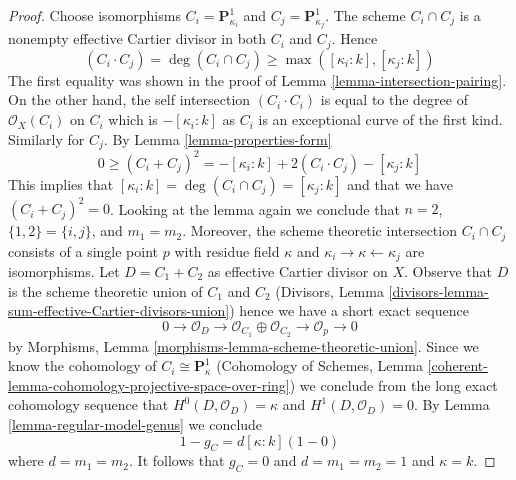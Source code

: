\documentclass[10pt,a4paper]{amsart}
\theoremstyle{plain}
\theoremstyle{definition}
\theoremstyle{remark}
\numberwithin{equation}{subsection}
\begin{document}
\begin{proof}
Choose isomorphisms $C_i = \mathbf{P}^1_{\kappa_i}$ and
$C_j = \mathbf{P}^1_{\kappa_j}$. The scheme $C_i \cap C_j$
is a nonempty effective Cartier divisor in both $C_i$ and $C_j$.
Hence
$$
(C_i \cdot C_j) = \deg(C_i \cap C_j) \geq \max([\kappa_i: k], [\kappa_j : k])
$$
The first equality was shown in the proof of
Lemma \ref{lemma-intersection-pairing}.
On the other hand, the self intersection $(C_i \cdot C_i)$ is equal
to the degree of $\mathcal{O}_X(C_i)$ on $C_i$ which is $-[\kappa_i : k]$
as $C_i$ is an exceptional curve of the first kind. Similarly for
$C_j$. By Lemma \ref{lemma-properties-form}
$$
0 \geq (C_i + C_j)^2 = -[\kappa_i : k] + 2(C_i \cdot C_j) - [\kappa_j : k]
$$
This implies that $[\kappa_i : k] = \deg(C_i \cap C_j) = [\kappa_j : k]$
and that we have $(C_i + C_j)^2 = 0$. Looking at the lemma again
we conclude that $n = 2$, $\{1, 2\} = \{i, j\}$, and $m_1 = m_2$.
Moreover, the scheme theoretic intersection $C_i \cap C_j$ consists of
a single point $p$ with residue field $\kappa$ and
$\kappa_i \to \kappa \leftarrow \kappa_j$ are isomorphisms.
Let $D = C_1 + C_2$ as effective Cartier divisor on $X$.
Observe that $D$ is the scheme theoretic union of $C_1$ and $C_2$
(Divisors, Lemma \ref{divisors-lemma-sum-effective-Cartier-divisors-union})
hence we have a short exact sequence
$$
0 \to \mathcal{O}_D \to \mathcal{O}_{C_1} \oplus \mathcal{O}_{C_2} \to
\mathcal{O}_p \to 0
$$
by Morphisms, Lemma \ref{morphisms-lemma-scheme-theoretic-union}.
Since we know the cohomology of $C_i \cong \mathbf{P}^1_\kappa$
(Cohomology of Schemes, Lemma
\ref{coherent-lemma-cohomology-projective-space-over-ring})
we conclude from the long exact cohomology sequence that
$H^0(D, \mathcal{O}_D) = \kappa$ and
$H^1(D, \mathcal{O}_D) = 0$. By Lemma \ref{lemma-regular-model-genus}
we conclude
$$
1 - g_C = d[\kappa : k](1 - 0)
$$
where $d = m_1 = m_2$. It follows that $g_C = 0$ and $d = m_1 = m_2 = 1$
and $\kappa = k$.
\end{proof}
\end{document}
